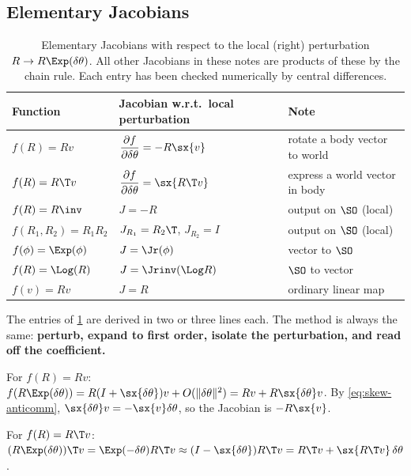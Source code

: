 \subsection{Elementary Jacobians}

\begin{table}[t]
\centering\small
\renewcommand{\arraystretch}{1.35}
\begin{tabular}{@{}l l l@{}}
\toprule
Function & Jacobian w.r.t.\ local perturbation & Note \\
\midrule
$f(R) = Rv$ & $\dfrac{\partial f}{\partial\delta\theta} = -R\sx{v}$ & rotate a body vector to world \\
$f(R) = R\T v$ & $\dfrac{\partial f}{\partial\delta\theta} = \sx{R\T v}$ & express a world vector in body \\
$f(R) = R\inv$ & $J = -R$ & output on $\SO$ (local) \\
$f(R_1, R_2) = R_1R_2$ & $J_{R_1} = R_2\T$, \quad $J_{R_2} = I$ & output on $\SO$ (local) \\
$f(\phi) = \Exp(\phi)$ & $J = \Jr(\phi)$ & vector to $\SO$ \\
$f(R) = \Log(R)$ & $J = \Jrinv(\Log R)$ & $\SO$ to vector \\
$f(v) = Rv$ & $J = R$ & ordinary linear map \\
\bottomrule
\end{tabular}
\caption{Elementary Jacobians with respect to the local (right) perturbation $R \to R\Exp(\delta\theta)$. All
other Jacobians in these notes are products of these by the chain rule. Each entry has been checked
numerically by central differences.}
\label{tab:jacobians}
\end{table}

The entries of \cref{tab:jacobians} are derived in two or three lines each. The method is always the same:
\textbf{perturb, expand to first order, isolate the perturbation, and read off the coefficient.}

\begin{example}
\label{ex:rotation-action}
For $f(R) = Rv$: $f(R\Exp(\delta\theta)) = R(I + \sx{\delta\theta})v + O(\|\delta\theta\|^2) = Rv + R\sx{\delta\theta}v$.
By \eqref{eq:skew-anticomm}, $\sx{\delta\theta}v = -\sx{v}\delta\theta$, so the Jacobian is $-R\sx{v}$.
\end{example}

\begin{example}
For $f(R) = R\T v$: $(R\Exp(\delta\theta))\T v = \Exp(-\delta\theta)R\T v \approx (I - \sx{\delta\theta})R\T v =
R\T v + \sx{R\T v}\,\delta\theta$.
\end{example}

